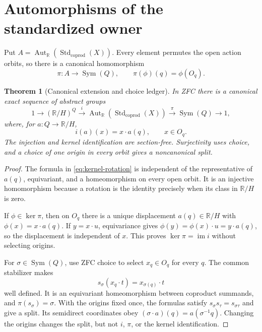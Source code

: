 \documentclass[11pt]{article}
\newtheorem{theorem}{Theorem}[section]
\theoremstyle{definition}
\newcommand{\R}{\mathbb R}
\newcommand{\Std}{\operatorname{Std}_{\mathrm{coprod}}}
\newcommand{\AutR}{\operatorname{Aut}_{\R}}
\newcommand{\Sym}{\operatorname{Sym}}
\newcommand{\im}{\operatorname{im}}
\begin{document}
\section{Automorphisms of the standardized owner}
\label{sec:automorphisms}

Put $A=\AutR(\Std(X))$.  Every element permutes the open action orbits, so
there is a canonical homomorphism
\begin{equation}
\label{eq:orbit-permutation}
 \pi:A\longrightarrow\Sym(Q),\qquad
 \pi(\phi)(q)=\phi(O_q).
\end{equation}

\begin{theorem}[Canonical extension and choice ledger]
\label{thm:automorphism-extension}
In ZFC there is a canonical exact sequence of abstract groups
\begin{equation}
\label{eq:automorphism-extension}
 1\longrightarrow(\R/H)^Q\xrightarrow{\ i\ }
 \AutR(\Std(X))\xrightarrow{\ \pi\ }\Sym(Q)
 \longrightarrow1,
\end{equation}
where, for $a:Q\to\R/H$,
\begin{equation}
\label{eq:kernel-rotation}
 i(a)(x)=x\mathbin{\cdot}a(q),\qquad x\in O_q.
\end{equation}
The injection and kernel identification are section-free.  Surjectivity uses
choice, and a choice of one origin in every orbit gives a noncanonical split.
\end{theorem}

\begin{proof}
The formula in \cref{eq:kernel-rotation} is independent of the representative
of $a(q)$, equivariant, and a homeomorphism on every open orbit.  It is an
injective homomorphism because a rotation is the identity precisely when its
class in $\R/H$ is zero.

If $\phi\in\ker\pi$, then on $O_q$ there is a unique displacement
$a(q)\in\R/H$ with $\phi(x)=x\cdot a(q)$.  If
$y=x\cdot u$, equivariance gives
$\phi(y)=\phi(x)\cdot u=y\cdot a(q)$, so the displacement is independent
of $x$.  This proves $\ker\pi=\im i$ without selecting origins.

For $\sigma\in\Sym(Q)$, use ZFC choice to select $x_q\in O_q$ for every
$q$.  The common stabilizer makes
\begin{equation}
\label{eq:choice-lift}
 s_\sigma(x_q\mathbin{\cdot}t)=x_{\sigma(q)}\mathbin{\cdot}t
\end{equation}
well defined.  It is an equivariant homeomorphism between coproduct summands,
and $\pi(s_\sigma)=\sigma$.  With the origins fixed once, the formulas
satisfy $s_\sigma s_\tau=s_{\sigma\tau}$ and give a split.  Its semidirect
coordinates obey
$(\sigma\cdot a)(q)=a(\sigma^{-1}q)$.  Changing the origins changes the
split, but not $i$, $\pi$, or the kernel identification.
\end{proof}
\end{document}

